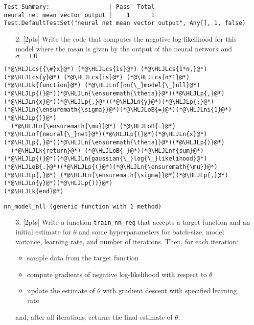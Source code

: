 \documentclass[12pt,a4paper]{article}
\newcommand{\HLJLk}[1]{\textcolor[RGB]{148,91,176}{\textbf{#1}}}
\newcommand{\HLJLn}[1]{#1}
\newcommand{\HLJLnf}[1]{\textcolor[RGB]{66,102,213}{#1}}
\newcommand{\HLJLni}[1]{\textcolor[RGB]{59,151,46}{#1}}
\newcommand{\HLJLoB}[1]{\textcolor[RGB]{102,102,102}{\textbf{#1}}}
\newcommand{\HLJLp}[1]{#1}
\newcommand{\HLJLcs}[1]{\textcolor[RGB]{153,153,119}{\textit{#1}}}
\begin{document}
\begin{lstlisting}
Test Summary:                 | Pass  Total
neural net mean vector output |    1      1
Test.DefaultTestSet("neural net mean vector output", Any[], 1, false)
\end{lstlisting}


\begin{itemize}
\item[2. ] [2pts] Write the code that computes the negative log-likelihood for this model where the mean is given by the output of the neural network and $\sigma = 1.0$

\end{itemize}

\begin{lstlisting}
(*@\HLJLcs{{\#}x}@*) (*@\HLJLcs{is}@*) (*@\HLJLcs{1*n,}@*) (*@\HLJLcs{y}@*) (*@\HLJLcs{is}@*) (*@\HLJLcs{n*1}@*)
(*@\HLJLk{function}@*) (*@\HLJLnf{nn{\_}model{\_}nll}@*)(*@\HLJLp{(}@*)(*@\HLJLn{\ensuremath{\theta}}@*)(*@\HLJLp{,}@*)(*@\HLJLn{x}@*)(*@\HLJLp{,}@*)(*@\HLJLn{y}@*)(*@\HLJLp{;}@*)(*@\HLJLn{\ensuremath{\sigma}}@*)(*@\HLJLoB{=}@*)(*@\HLJLni{1}@*)(*@\HLJLp{)}@*)
  (*@\HLJLn{\ensuremath{\mu}}@*) (*@\HLJLoB{=}@*) (*@\HLJLnf{neural{\_}net}@*)(*@\HLJLp{(}@*)(*@\HLJLn{x}@*)(*@\HLJLp{,}@*)(*@\HLJLn{\ensuremath{\theta}}@*)(*@\HLJLp{)}@*)
  (*@\HLJLk{return}@*) (*@\HLJLoB{-}@*)(*@\HLJLnf{sum}@*)(*@\HLJLp{(}@*)(*@\HLJLn{gaussian{\_}log{\_}likelihood}@*)(*@\HLJLoB{.}@*)(*@\HLJLp{(}@*)(*@\HLJLn{\ensuremath{\mu}}@*)(*@\HLJLp{,}@*) (*@\HLJLn{\ensuremath{\sigma}}@*)(*@\HLJLp{,}@*) (*@\HLJLn{y}@*)(*@\HLJLp{))}@*)
(*@\HLJLk{end}@*)
\end{lstlisting}

\begin{lstlisting}
nn_model_nll (generic function with 1 method)
\end{lstlisting}


\begin{itemize}
\item[3. ] [2pts] Write a function \texttt{train\_nn\_reg} that accepts a target function and an initial estimate for $\theta$ and some  hyperparameters for batch-size, model variance, learning rate, and number of iterations.  Then, for each iteration:

\begin{itemize}
\item sample data from the target function


\item compute gradients of negative log-likelihood with respect to $\theta$


\item update the estimate of $\theta$ with gradient descent with specified learning rate

\end{itemize}
and, after all iterations, returns the final estimate of $\theta$.

\end{itemize}
\end{document}
